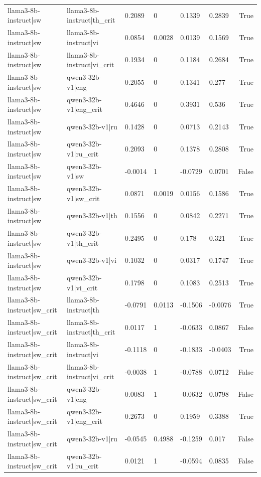 \begin{table}
\begin{tabular}{llllllr}
llama3-8b-instruct|sw & llama3-8b-instruct|th_crit & 0.2089 & 0 & 0.1339 & 0.2839 & True \\
llama3-8b-instruct|sw & llama3-8b-instruct|vi & 0.0854 & 0.0028 & 0.0139 & 0.1569 & True \\
llama3-8b-instruct|sw & llama3-8b-instruct|vi_crit & 0.1934 & 0 & 0.1184 & 0.2684 & True \\
llama3-8b-instruct|sw & qwen3-32b-v1|eng & 0.2055 & 0 & 0.1341 & 0.277 & True \\
llama3-8b-instruct|sw & qwen3-32b-v1|eng_crit & 0.4646 & 0 & 0.3931 & 0.536 & True \\
llama3-8b-instruct|sw & qwen3-32b-v1|ru & 0.1428 & 0 & 0.0713 & 0.2143 & True \\
llama3-8b-instruct|sw & qwen3-32b-v1|ru_crit & 0.2093 & 0 & 0.1378 & 0.2808 & True \\
llama3-8b-instruct|sw & qwen3-32b-v1|sw & -0.0014 & 1 & -0.0729 & 0.0701 & False \\
llama3-8b-instruct|sw & qwen3-32b-v1|sw_crit & 0.0871 & 0.0019 & 0.0156 & 0.1586 & True \\
llama3-8b-instruct|sw & qwen3-32b-v1|th & 0.1556 & 0 & 0.0842 & 0.2271 & True \\
llama3-8b-instruct|sw & qwen3-32b-v1|th_crit & 0.2495 & 0 & 0.178 & 0.321 & True \\
llama3-8b-instruct|sw & qwen3-32b-v1|vi & 0.1032 & 0 & 0.0317 & 0.1747 & True \\
llama3-8b-instruct|sw & qwen3-32b-v1|vi_crit & 0.1798 & 0 & 0.1083 & 0.2513 & True \\
llama3-8b-instruct|sw_crit & llama3-8b-instruct|th & -0.0791 & 0.0113 & -0.1506 & -0.0076 & True \\
llama3-8b-instruct|sw_crit & llama3-8b-instruct|th_crit & 0.0117 & 1 & -0.0633 & 0.0867 & False \\
llama3-8b-instruct|sw_crit & llama3-8b-instruct|vi & -0.1118 & 0 & -0.1833 & -0.0403 & True \\
llama3-8b-instruct|sw_crit & llama3-8b-instruct|vi_crit & -0.0038 & 1 & -0.0788 & 0.0712 & False \\
llama3-8b-instruct|sw_crit & qwen3-32b-v1|eng & 0.0083 & 1 & -0.0632 & 0.0798 & False \\
llama3-8b-instruct|sw_crit & qwen3-32b-v1|eng_crit & 0.2673 & 0 & 0.1959 & 0.3388 & True \\
llama3-8b-instruct|sw_crit & qwen3-32b-v1|ru & -0.0545 & 0.4988 & -0.1259 & 0.017 & False \\
llama3-8b-instruct|sw_crit & qwen3-32b-v1|ru_crit & 0.0121 & 1 & -0.0594 & 0.0835 & False \\

\end{tabular}
\end{table}
